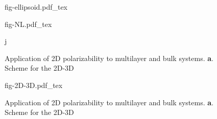 



\begin{figure}[!htbp]
  \centering
  {fig-ellipsoid.pdf_tex}
  \caption{%
  }
  \label{fig:diel-ellipsoid}
\end{figure}

\begin{figure}[!htbp]
\centering
{fig-NL.pdf_tex}
  \caption{\label{fig:diel-NL}  %
    Application of 2D polarizability to
    multilayer and bulk systems.
    \textbf{a}. Scheme for the 2D-3D}j

\end{figure}

\begin{figure}[!htbp]
\centering
{fig-2D-3D.pdf_tex}
  \caption{\label{fig:diel-2D-3D}  %
    Application of 2D polarizability to
    multilayer and bulk systems.
    \textbf{a}. Scheme for the 2D-3D}
\end{figure}



